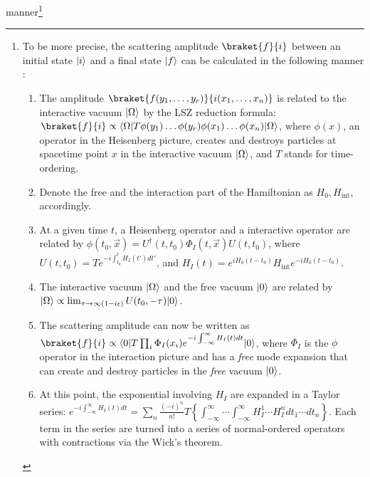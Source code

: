 manner\footnote{
    To be more precise, the scattering amplitude $\braket{f}{i}$
    between an initial state $\lvert i\rangle$
    and a final state $\lvert f\rangle$
    can be calculated in the following
    manner \cite{Weigand}:
    \begin{enumerate}
        \item The amplitude $\braket{f(y_1, \dots, y_r)}{i(x_1, \dots, x_n)}$
            is related to the interactive vacuum
            $\lvert\Omega\rangle$ by the LSZ reduction formula:
            $\braket{f}{i} \propto \bra{\Omega} T \phi(y_1) \dots \phi(y_r) \phi(x_1) \dots \phi(x_n) \ket{\Omega}$,
            where $\phi(x)$, an operator in the Heisenberg picture,
            creates and destroys particles at spacetime point $x$ in the
            interactive vacuum $\lvert\Omega\rangle$,
            and $T$ stands for time-ordering.

        \item Denote the free and the interaction part of the Hamiltonian
            as $H_0, H_\text{int}$, accordingly.

        \item At a given time $t$, a Heisenberg operator and a interactive
            operator are related by
            $\phi(t_0, \vec{x}) = U^\dagger (t, t_0) \Phi_I(t, \vec{x}) U(t, t_0)$,
            where $U(t, t_0) = T e^{-i \int_{t_0}^t H_I(t') d t'}$, and
            $H_I(t) = e^{iH_0(t-t_0)} H_\text{int} e^{-iH_0(t-t_0)}$.

        \item The interactive vacuum $\lvert\Omega\rangle$ and the free vacuum
            $\lvert0\rangle$ are related by
            $\lvert\Omega\rangle \propto \lim_{\tau \rightarrow \infty(1 - i\epsilon)} U(t_0, -\tau)\lvert0\rangle$.

        \item The scattering amplitude can now be written as
            $\braket{f}{i} \propto \bra{0} T \prod_i \Phi_I(x_i) e^{-i \int_{-\infty}^{\infty} H_I(t) dt} \ket{0}$,
            where $\Phi_I$ is the $\phi$ operator in the interaction picture
            and has a \emph{free} mode expansion that can create and destroy
            particles in the \emph{free} vacuum $\lvert0\rangle$.

        \item At this point,
            the exponential involving $H_I$ are expanded in a Taylor series:
            $e^{-i \int_{-\infty}^{\infty} H_I(t) dt} = \sum_n \frac{(-i)^n}{n!} T\left\{
                \int_{-\infty}^{\infty} \cdots \int_{-\infty}^{\infty}
                H_{I}^1 \cdots H_{I}^n d t_1 \cdots d t_n
            \right\}$.
            Each term in the series are turned into a series of
            normal-ordered operators with contractions via the Wick's theorem.


\end{enumerate}}
